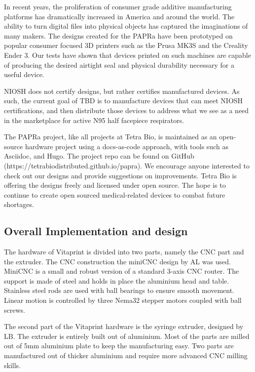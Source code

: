\documentclass[a4paper]{article}
\begin{document}
{In recent years, the proliferation of consumer grade additive manufacturing platforms has dramatically increased in America and around the world. The ability to turn digital files into physical objects has captured the imaginations of many makers. The designs created for the PAPRa have been prototyped on popular consumer focused 3D printers such as the Prusa MK3S and the Creality Ender 3. Our tests have shown that devices printed on such machines are capable of producing the desired airtight seal and physical durability necessary for a useful device.

NIOSH does not certify designs, but rather certifies manufactured devices.  As such, the current goal of TBD is to manufacture devices that can meet NIOSH certifications, and then distribute those devices to address what we see as a need in the marketplace for active N95 half facepiece respirators.

The PAPRa project, like all projects at Tetra Bio, is maintained as an open-source hardware project using a docs-as-code approach, with tools such as Asciidoc, and Hugo. The project repo can be found on GitHub (https://tetrabiodistributed.github.io/papra). We encourage anyone interested to check out our designs and provide suggestions on improvements. Tetra Bio is offering the designs freely and licensed under open source. The hope is to continue to create open sourced medical-related devices to combat future shortages.
}


\subsection{Overall Implementation and design}\label{h.1u7vph94gfbt}

The hardware of Vitaprint is divided into two parts, namely the CNC part and the extruder. The CNC construction the miniCNC design by AL was used. MiniCNC is a small and robust version of a standard 3-axis CNC router. The support is made of steel and holds in place the aluminium head and table. Stainless steel rods are used with ball bearings to ensure smooth movement. Linear motion is controlled by three Nema32 stepper motors coupled with ball screws.

The second part of the Vitaprint hardware is the syringe extruder, designed by LB. The extruder is entirely built out of aluminium. Most of the parts are milled out of 5mm aluminium plate to keep the manufacturing easy. Two parts are manufactured out of thicker aluminium and require more advanced CNC milling skills.
\end{document}
